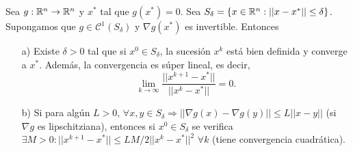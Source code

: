 \documentclass[MIOP.tex]{subfiles}
\begin{document}
\begin{teorema}
Sea $g:\mathbb{R}^n\to\mathbb{R}^n$ y $x^*$ tal que $g(x^*)=0$. Sea $S_\delta=\{x\in\mathbb{R}^n:||x-x^*||\leq\delta\}$. Supongamos que $g\in\mathcal{C}^1(S_\delta)$ y $\nabla g(x^*)$ es invertible. Entonces
\begin{itemize}
\item[a)] Existe $\delta>0$ tal que si $x^0\in S_\delta$, la sucesión $x^k$ está bien definida y converge a $x^*$. Además, la convergencia es súper lineal, es decir,
$$\lim_{k\to\infty}\frac{||x^{k+1}-x^*||}{||x^k-x^*||}=0.$$
\item[b)] Si para algún $L>0$, $\forall x,y\in S_\delta\Rightarrow ||\nabla g(x)-\nabla g(y)||\leq L||x-y||$ (si $\nabla g$ es lipschitziana), entonces si $x^0\in S_\delta$ se verifica $\exists M>0:||x^{k+1}-x^*||\leq LM/2||x^k-x^*||^2$ $\forall k$ (tiene convergencia cuadrática).
\end{itemize}
\end{teorema}
\end{document}
